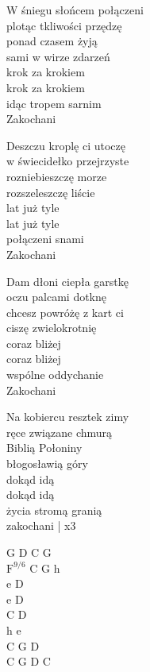 \begin{textn}
    W śniegu słońcem połączeni\\
    plotąc tkliwości przędzę\\
    ponad czasem żyją\\
    sami w wirze zdarzeń\\
    krok za krokiem\\
    krok za krokiem\\
    idąc tropem sarnim\\
    Zakochani

    Deszczu kroplę ci utoczę\\
    w świecidełko przejrzyste\\
    rozniebieszczę morze\\
    rozszeleszczę liście\\
    lat już tyle\\
    lat już tyle\\
    połączeni snami\\
    Zakochani

    Dam dłoni ciepła garstkę\\
    oczu palcami dotknę\\
    chcesz powróżę z kart ci\\
    ciszę zwielokrotnię\\
    coraz bliżej\\
    coraz bliżej\\
    wspólne oddychanie\\
    Zakochani

    Na kobiercu resztek zimy\\
    ręce związane chmurą\\
    Biblią Połoniny\\
    błogosławią góry\\
    dokąd idą\\
    dokąd idą\\
    życia stromą granią\\
    zakochani | x3
\end{textn}
\begin{chordw}
    G D C G\\
    $\mathrm{F^{9/6}}$ C G h\\
    e D\\
    e D\\
    C D\\
    h e\\
    C G D\\
    C G D C
\end{chordw}
